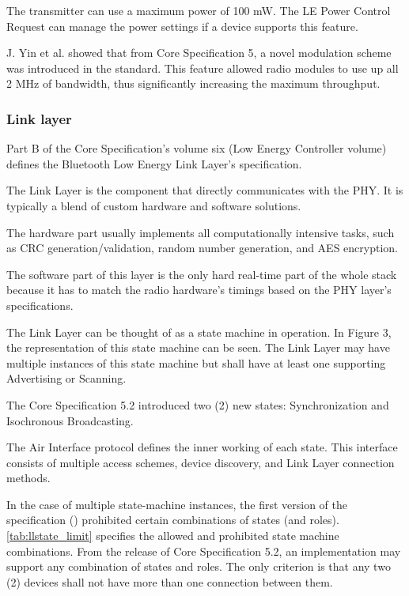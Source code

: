 The transmitter can use a maximum power of 100 mW.
The LE Power Control Request can manage the power settings if a device supports this feature.

J. Yin et al. \cite{Yin:19} showed that from Core Specification 5, a novel
modulation scheme was introduced in the standard.
This feature allowed radio modules to use up all 2 MHz of bandwidth,
thus significantly increasing the maximum throughput.

\subsubsection{Link layer}
\label{ble:controller:link}
Part B of the Core Specification's volume six (Low Energy Controller volume)
defines the Bluetooth Low Energy Link Layer's specification.

The Link Layer is the component that directly communicates with the PHY.
It is typically a blend of custom hardware and software solutions. \cite{Townsend14}

The hardware part usually implements all computationally intensive tasks,
such as CRC generation/validation, random number generation, and AES encryption. 

The software part of this layer is the only hard real-time part of
the whole stack because it has to match the radio hardware's timings
based on the PHY layer's specifications.

The Link Layer can be thought of as a state machine in operation.
In Figure 3, the representation of this state machine can be seen.
The Link Layer may have multiple instances of this state machine but shall have at least one supporting Advertising or Scanning.\cite{bt40}

The Core Specification 5.2 introduced two (2) new states:
Synchronization and Isochronous Broadcasting.

The Air Interface protocol defines the inner working of each state.
This interface consists of multiple access schemes, device discovery,
and Link Layer connection methods.

In the case of multiple state-machine instances, the first version of the
specification (\cite{bt40}) prohibited certain combinations of states (and roles).
\autoref{tab:llstate_limit} specifies the allowed and prohibited state machine combinations.
From the release of Core Specification 5.2, an implementation may support
any combination of states and roles. The only criterion is that any two (2)
devices shall not have more than one connection between them. \cite{bt52}


